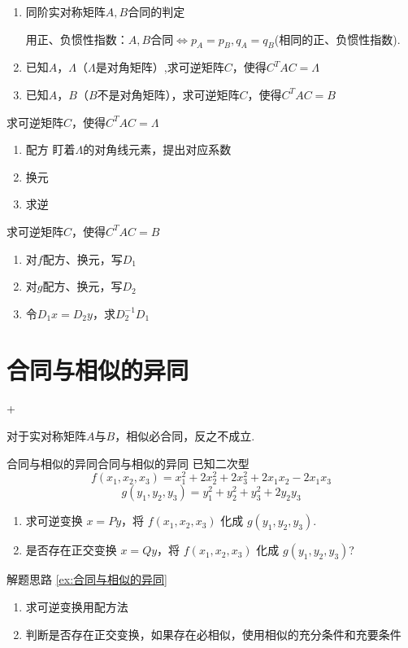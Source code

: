\begin{enumerate}
    \item 同阶实对称矩阵$A,B$合同的判定

          用正、负惯性指数：$A,B$合同$\Leftrightarrow p_A=p_B,q_A=q_B$(相同的正、负惯性指数).
    \item 已知$A$，$\Lambda$（$\Lambda$是对角矩阵）,求可逆矩阵$C$，使得$C^TAC=\Lambda$
    \item 已知$A$，$B$（$B$不是对角矩阵），求可逆矩阵$C$，使得$C^TAC=B$
\end{enumerate}
\begin{idea}{求可逆矩阵$C$，使得$C^TAC=\Lambda$}{}
    \begin{enumerate}
        \item 配方 盯着$\Lambda$的对角线元素，提出对应系数
        \item 换元
        \item 求逆
    \end{enumerate}
\end{idea}
\begin{idea}{求可逆矩阵$C$，使得$C^TAC=B$}{}
    \begin{enumerate}
        \item 对$f$配方、换元，写$D_1$
        \item 对$g$配方、换元，写$D_2$
        \item 令$D_1x=D_2y$，求$D_2^{-1}D_1$
    \end{enumerate}
\end{idea}
\section{合同与相似的异同}
\DOne+\DTwoThree

对于实对称矩阵$A$与$B$，相似必合同，反之不成立.
\begin{example}{合同与相似的异同}{合同与相似的异同}
    已知二次型
    $$f(x_{1}, x_{2}, x_{3}) = x_{1}^{2} + 2x_{2}^{2} + 2x_{3}^{2} + 2x_{1}x_{2} - 2x_{1}x_{3}$$
    $$
        g(y_{1}, y_{2}, y_{3}) = y_{1}^{2} + y_{2}^{2} + y_{3}^{2} + 2y_{2}y_{3}$$
    \begin{enumerate}
        \item 求可逆变换 $x = Py$，将 $f(x_{1}, x_{2}, x_{3})$ 化成 $g(y_{1}, y_{2}, y_{3})$.
        \item 是否存在正交变换 $x = Qy$，将 $f(x_{1}, x_{2}, x_{3})$ 化成 $g(y_{1}, y_{2}, y_{3})$?
    \end{enumerate}
\end{example}
\begin{idea}{解题思路 \ref{ex:合同与相似的异同}}{}
    \begin{enumerate}
        \item 求可逆变换用配方法
        \item 判断是否存在正交变换，如果存在必相似，使用相似的充分条件和充要条件
    \end{enumerate}
\end{idea}
